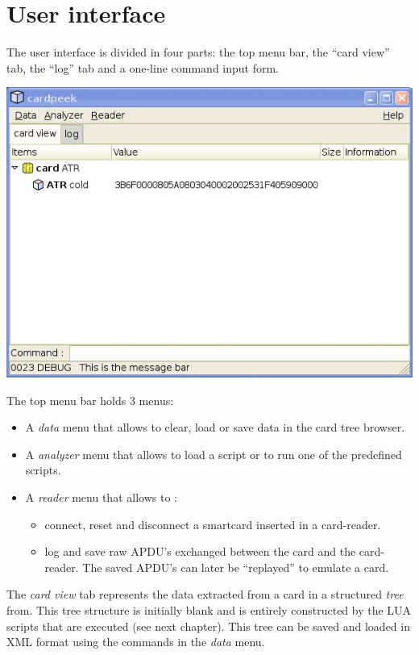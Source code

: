 \documentclass[11pt]{report}
\begin{document}
\section{User interface}

The user interface is divided in four parts: the top menu bar, the ``card view'' tab, the ``log'' tab and a one-line command input form.

\begin{center}
\includegraphics[width=.75\textwidth]{graphics/sample-blank.jpg}
\end{center}

The top menu bar holds 3 menus:
\begin{itemize}
\item{A \emph{data} menu that allows to clear, load or save data in the card tree browser.}  
\item{A \emph{analyzer} menu that allows to load a script or to run one of the predefined scripts.}
\item{A \emph{reader} menu that allows to :
  \begin{itemize} 
  \item{connect, reset and disconnect a smartcard inserted in a card-reader.}
  \item{log and save raw APDU's exchanged between the card and the card-reader. The saved APDU's can later be ``replayed'' to emulate a card.}
  \end{itemize}}
\end{itemize}

The \emph{card view} tab represents the data extracted from a card in a structured \emph{tree} from.
This tree structure is initially blank and is entirely constructed by the LUA scripts that are executed (see next chapter).
This tree can be saved and loaded in XML format using the commands in the \emph{data} menu.
\end{document}
